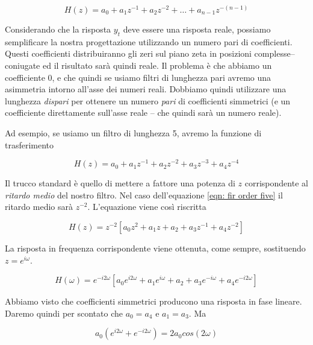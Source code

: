 \begin{equation}
	H(z) = a_0 + a_1 z^{-1} + a_2 z^{-2} + \dots + a_{n-1} z^{-(n-1)}
\end{equation}

Considerando che la risposta $y_t$ deve essere una risposta reale, possiamo
semplificare la nostra progettazione utilizzando un numero pari di
coefficienti. Questi coefficienti distribuiranno gli zeri sul piano zeta in
posizioni complesse--coniugate ed il risultato sar\`a quindi reale.
Il problema \`e che abbiamo un coefficiente $0$, e che quindi se usiamo filtri
di lunghezza pari avremo una asimmetria intorno all'asse dei numeri reali.
Dobbiamo quindi utilizzare una lunghezza \emph{dispari} per ottenere un numero
\emph{pari} di coefficienti simmetrici (e un coefficiente direttamente
sull'asse reale -- che quindi sar\`a un numero reale).

Ad esempio, se usiamo un filtro di lunghezza 5, avremo la funzione di
trasferimento

\begin{equation}\label{eqn: fir order five}
		H(z) = a_0 + a_1 z^{-1} + a_2 z^{-2} + a_3 z^{-3} + a_4 z^{-4}
\end{equation}

Il trucco standard \`e quello di mettere a fattore una potenza di $z$
corrispondente al \emph{ritardo medio} del nostro filtro. Nel caso
dell'equazione \ref{eqn: fir order five} il ritardo medio sar\`a $z^{-2}$.
L'equazione viene cos\`i riscritta

\begin{equation}\label{eqn: fir order five rewritten}
	H(z) = z^{-2} \left [ a_0 z^{2} + a_1 z + a_2 + a_3 z^{-1} + a_4 z^{-2} \right ]
\end{equation}

La risposta in frequenza corrispondente viene ottenuta, come sempre,
sostituendo $z = e^{i \omega}$.

\begin{equation}\label{eqn: fir order five freq response}
	H(\omega) = e^{-i2\omega} \left [ a_0 e^{i2\omega} + a_1 e^{i\omega} + a_2 + a_3 e^{-i\omega} + a_4 e^{-i2\omega} \right ]
\end{equation}

Abbiamo visto che coefficienti simmetrici producono una risposta in fase
lineare. Daremo quindi per scontato che $a_0 = a_4$ e $a_1 = a_3$.
Ma 

\begin{equation}
	a_0 ( e^{i 2 \omega} + e^{-i 2 \omega} ) = 2 a_0 cos(2 \omega)
\end{equation}

